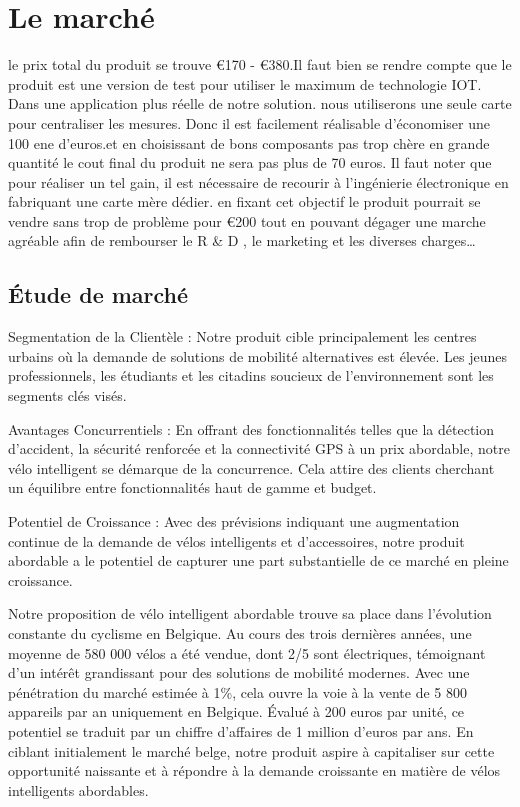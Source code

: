 \chapter{Le marché }

le prix total du produit se trouve  €170 - €380.Il faut bien se rendre compte que le produit est une version de test pour utiliser le maximum de technologie IOT. Dans une application plus réelle de notre solution. nous utiliserons une seule carte pour centraliser les mesures. Donc il est facilement réalisable d'économiser une 100 ene d'euros.et en choisissant de bons composants pas trop chère en grande quantité le cout final du produit ne sera pas plus de 70 euros. Il faut noter que pour réaliser un tel gain, il est nécessaire de recourir à l'ingénierie électronique en fabriquant une carte mère dédier. en fixant cet objectif le produit pourrait se vendre sans trop de problème pour €200 tout en pouvant dégager une marche agréable afin de rembourser le R \& D , le marketing et les diverses charges…  


\section{Étude de marché }


Segmentation de la Clientèle : Notre produit cible principalement les centres urbains où la demande de solutions de mobilité alternatives est élevée. Les jeunes professionnels, les étudiants et les citadins soucieux de l'environnement sont les segments clés visés.


Avantages Concurrentiels : En offrant des fonctionnalités telles que la détection d'accident, la sécurité renforcée et la connectivité GPS à un prix abordable, notre vélo intelligent se démarque de la concurrence. Cela attire des clients cherchant un équilibre entre fonctionnalités haut de gamme et budget.


Potentiel de Croissance : Avec des prévisions indiquant une augmentation continue de la demande de vélos intelligents et d'accessoires, notre produit abordable a le potentiel de capturer une part substantielle de ce marché en pleine croissance.

Notre proposition de vélo intelligent abordable trouve sa place dans l'évolution constante du cyclisme en Belgique. Au cours des trois dernières années, une moyenne de 580 000 vélos a été vendue, dont 2/5 sont électriques, témoignant d'un intérêt grandissant pour des solutions de mobilité modernes. Avec une pénétration du marché estimée à 1\%, cela ouvre la voie à la vente de 5 800 appareils par an uniquement en Belgique. Évalué à 200 euros par unité, ce potentiel se traduit par un chiffre d'affaires de 1 million d'euros par ans. En ciblant initialement le marché belge, notre produit aspire à capitaliser sur cette opportunité naissante et à répondre à la demande croissante en matière de vélos intelligents abordables.

